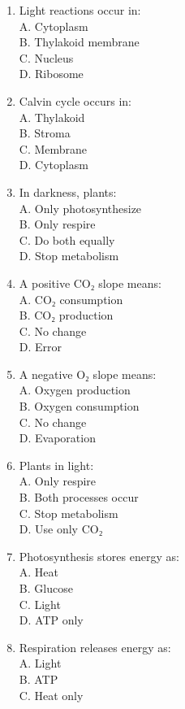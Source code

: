 \documentclass[
  letterpaper,
  DIV=11,
  numbers=noendperiod]{scrreprt}
\begin{document}
\begin{enumerate}
  A. Structural molecule\\
  B. Energy carrier\\
  C. Waste\\
  D. Gas
\item
  Light reactions occur in:\\
  A. Cytoplasm\\
  B. Thylakoid membrane\\
  C. Nucleus\\
  D. Ribosome
\item
  Calvin cycle occurs in:\\
  A. Thylakoid\\
  B. Stroma\\
  C. Membrane\\
  D. Cytoplasm
\item
  In darkness, plants:\\
  A. Only photosynthesize\\
  B. Only respire\\
  C. Do both equally\\
  D. Stop metabolism
\item
  A positive CO₂ slope means:\\
  A. CO₂ consumption\\
  B. CO₂ production\\
  C. No change\\
  D. Error
\item
  A negative O₂ slope means:\\
  A. Oxygen production\\
  B. Oxygen consumption\\
  C. No change\\
  D. Evaporation
\item
  Plants in light:\\
  A. Only respire\\
  B. Both processes occur\\
  C. Stop metabolism\\
  D. Use only CO₂
\item
  Photosynthesis stores energy as:\\
  A. Heat\\
  B. Glucose\\
  C. Light\\
  D. ATP only
\item
  Respiration releases energy as:\\
  A. Light\\
  B. ATP\\
  C. Heat only\\

\end{enumerate}
\end{document}
